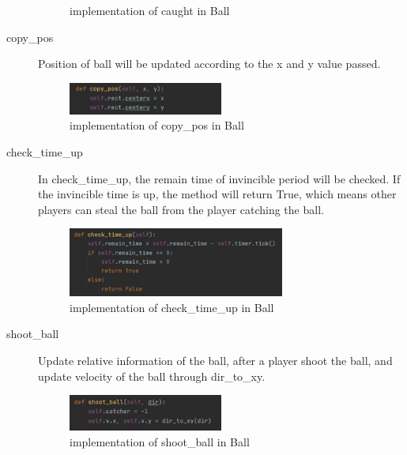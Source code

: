 \documentclass[14pt]{extarticle}
\begin{document}
\begin{description}
\begin{figure}[H]
\begin{center}
			\caption{implementation of caught in Ball}
		\end{center}
	\end{figure}
	\item[copy\_pos]
	Position of ball will be updated according to the x and y value passed.
	\begin{figure}[H]
		\begin{center}
			\includegraphics[width=0.5\textwidth]{Ball_copy_pos}
			\caption{implementation of copy\_pos in Ball}
		\end{center}
	\end{figure}
	\item[check\_time\_up]
	In check\_time\_up, the remain time of invincible period will be checked. If the invincible time is up, the method will return True, which means other players can steal the ball from the player catching the ball.
	\begin{figure}[H]
		\begin{center}
			\includegraphics[width=0.7\textwidth]{Ball_check_time}
			\caption{implementation of check\_time\_up in Ball}
		\end{center}
	\end{figure}
	\item[shoot\_ball]
	Update relative information of the ball, after a player shoot the ball, and update velocity of the ball through dir\_to\_xy.
	\begin{figure}[H]
		\begin{center}
			\includegraphics[width=0.5\textwidth]{Ball_shoot}
			\caption{implementation of shoot\_ball in Ball}
		\end{center}
	\end{figure}
	\begin{figure}[H]
		\begin{center}

\end{center}
\end{figure}
\end{description}
\end{document}

